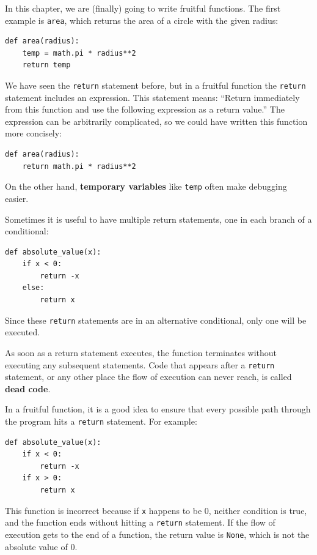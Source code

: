 In this chapter, we are (finally) going to write fruitful functions.
The first example is {\tt area}, which returns the area of a circle
with the given radius:

\beforeverb
\begin{verbatim}
def area(radius):
    temp = math.pi * radius**2
    return temp
\end{verbatim}
\afterverb
%
We have seen the {\tt return} statement before, but in a fruitful
function the {\tt return} statement includes
an expression.  This statement means: ``Return immediately from
this function and use the following expression as a return value.''
The expression can be arbitrarily complicated, so we could
have written this function more concisely:


\beforeverb
\begin{verbatim}
def area(radius):
    return math.pi * radius**2
\end{verbatim}
\afterverb
%
On the other hand, {\bf temporary variables} like {\tt temp} often make
debugging easier.


Sometimes it is useful to have multiple return statements, one in each
branch of a conditional:

\beforeverb
\begin{verbatim}
def absolute_value(x):
    if x < 0:
        return -x
    else:
        return x
\end{verbatim}
\afterverb
%
Since these {\tt return} statements are in an alternative conditional,
only one will be executed.

As soon as a return statement executes, the function
terminates without executing any subsequent statements.
Code that appears after a {\tt return} statement, or any other place
the flow of execution can never reach, is called {\bf dead code}.


In a fruitful function, it is a good idea to ensure
that every possible path through the program hits a
{\tt return} statement.  For example:

\beforeverb
\begin{verbatim}
def absolute_value(x):
    if x < 0:
        return -x
    if x > 0:
        return x
\end{verbatim}
\afterverb
%
This function is incorrect because if {\tt x} happens to be 0,
neither condition is true, and the function ends without hitting a
{\tt return} statement.  If the flow of execution gets to the end
of a function, the return value is {\tt None}, which is not
the absolute value of 0.

